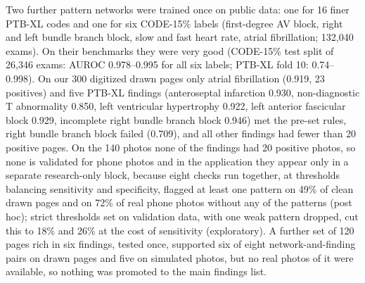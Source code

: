 \documentclass[conference]{IEEEtran}
\begin{document}
\begin{table}[t]
\caption{Pattern network, AUROC (95\% interval)}
\label{tab:find}
\centering
\footnotesize
\setlength{\tabcolsep}{3pt}
\end{table}

Two further pattern networks were trained once on public data: one for 16 finer PTB-XL codes and one for six CODE-15\% labels (first-degree AV block, right and left bundle branch block, slow and fast heart rate, atrial fibrillation; 132{,}040 exams). On their benchmarks they were very good (CODE-15\% test split of 26{,}346 exams: AUROC 0.978--0.995 for all six labels; PTB-XL fold 10: 0.74--0.998). On our 300 digitized drawn pages only atrial fibrillation (0.919, 23 positives) and five PTB-XL findings (anteroseptal infarction 0.930, non-diagnostic T abnormality 0.850, left ventricular hypertrophy 0.922, left anterior fascicular block 0.929, incomplete right bundle branch block 0.946) met the pre-set rules, right bundle branch block failed (0.709), and all other findings had fewer than 20 positive pages. On the 140 photos none of the findings had 20 positive photos, so none is validated for phone photos and in the application they appear only in a separate research-only block, because eight checks run together, at thresholds balancing sensitivity and specificity, flagged at least one pattern on 49\% of clean drawn pages and on 72\% of real phone photos without any of the patterns (post hoc); strict thresholds set on validation data, with one weak pattern dropped, cut this to 18\% and 26\% at the cost of sensitivity (exploratory). A further set of 120 pages rich in six findings, tested once, supported six of eight network-and-finding pairs on drawn pages and five on simulated photos, but no real photos of it were available, so nothing was promoted to the main findings list.
\end{document}
